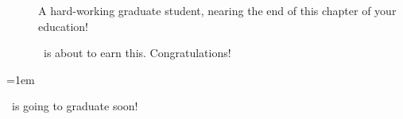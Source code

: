 \tableofcontents   %

\listoftables      %
\listoffigures     %
\listofillustrations     %
\listofmaps      %
\listofslides    %


%
%







%
\appendices



\begin{glossary}
\begin{description}
    \item[\theauthor] A hard-working graduate student, nearing the end of this chapter of your education!
    \item[\thedegree] \theauthor\ is about to earn this. Congratulations!
\end{description}
\end{glossary}

\emergencystretch=1em




\begin{vita}

\theauthor\ is going to graduate soon!
\end{vita}
